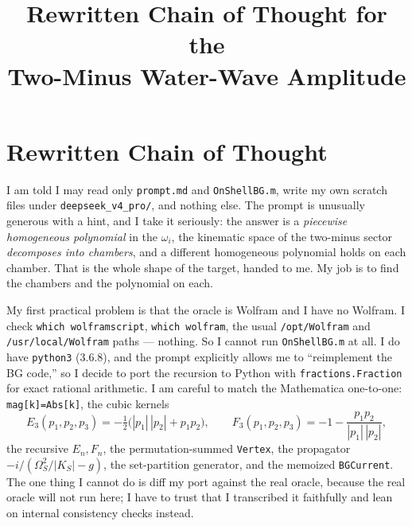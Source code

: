 \documentclass{article}
\title{Rewritten Chain of Thought for the\\
Two-Minus Water-Wave Amplitude}
\author{}
\date{}
\begin{document}
\maketitle


\section*{Rewritten Chain of Thought}

I am told I may read only \texttt{prompt.md} and \texttt{OnShellBG.m}, write my own
scratch files under \texttt{deepseek\_v4\_pro/}, and nothing else. The prompt is
unusually generous with a hint, and I take it seriously: the answer is a
\emph{piecewise homogeneous polynomial} in the $\omega_i$, the kinematic space of
the two-minus sector \emph{decomposes into chambers}, and a different homogeneous
polynomial holds on each chamber. That is the whole shape of the target, handed to
me. My job is to find the chambers and the polynomial on each.

My first practical problem is that the oracle is Wolfram and I have no Wolfram. I
check \texttt{which wolframscript}, \texttt{which wolfram}, the usual
\texttt{/opt/Wolfram} and \texttt{/usr/local/Wolfram} paths --- nothing. So I
cannot run \texttt{OnShellBG.m} at all. I do have \texttt{python3} (3.6.8), and the
prompt explicitly allows me to ``reimplement the BG code,'' so I decide to port the
recursion to Python with \texttt{fractions.Fraction} for exact rational arithmetic.
I am careful to match the Mathematica one-to-one: \texttt{mag[k]=Abs[k]}, the cubic
kernels
\[
E_3(p_1,p_2,p_3)=-\tfrac12\big(|p_1|\,|p_2|+p_1p_2\big),\qquad
F_3(p_1,p_2,p_3)=-1-\frac{p_1p_2}{|p_1|\,|p_2|},
\]
the recursive $E_n,F_n$, the permutation-summed \texttt{Vertex}, the propagator
$-i/(\Omega_S^2/|K_S|-g)$, the set-partition generator, and the memoized
\texttt{BGCurrent}. The one thing I cannot do is diff my port against the real
oracle, because the real oracle will not run here; I have to trust that I
transcribed it faithfully and lean on internal consistency checks instead.
\end{document}
